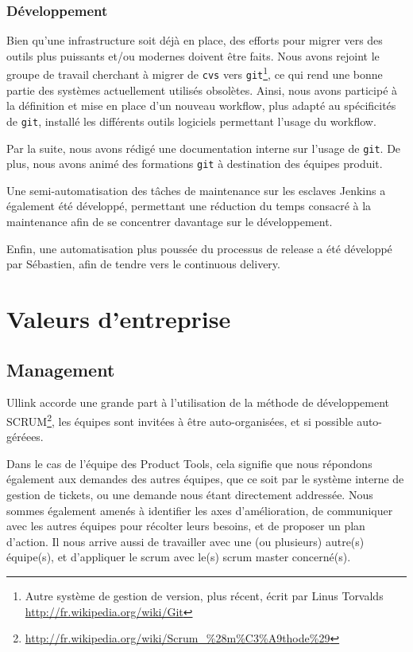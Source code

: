 \documentclass[a4paper, 12pt]{article}
\newcommand{\git}{\texttt{git}}
\begin{document}
\subsubsection{Développement}

Bien qu'une infrastructure soit déjà en place, des efforts pour migrer vers des outils plus puissants et/ou modernes doivent être faits. Nous avons rejoint le groupe de travail cherchant à migrer de \texttt{cvs} vers \git\footnote{Autre système de gestion de version, plus récent, écrit par Linus Torvalds \url{http://fr.wikipedia.org/wiki/Git}}, ce qui rend une bonne partie des systèmes actuellement utilisés obsolètes. Ainsi, nous avons participé à la définition et mise en place d'un nouveau workflow, plus adapté au spécificités de \git, installé les différents outils logiciels permettant l'usage du workflow.

Par la suite, nous avons rédigé une documentation interne sur l'usage de \git. De plus, nous avons animé des formations \texttt{git} à destination des équipes produit.

Une semi-automatisation des tâches de maintenance sur les esclaves Jenkins a également été développé, permettant une réduction du temps consacré à la maintenance afin de se concentrer davantage sur le développement.

Enfin, une automatisation plus poussée du processus de release a été développé par Sébastien, afin de tendre vers le continuous delivery.

\section{Valeurs d'entreprise}

\subsection{Management}

Ullink accorde une grande part à l'utilisation de la méthode de développement SCRUM\footnote{\url{http://fr.wikipedia.org/wiki/Scrum_\%28m\%C3\%A9thode\%29}}, les équipes sont invitées à être auto-organisées, et si possible auto-géréees.

Dans le cas de l'équipe des Product Tools, cela signifie que nous répondons également aux demandes des autres équipes, que ce soit par le système interne de gestion de tickets, ou une demande nous étant directement addressée. Nous sommes également amenés à identifier les axes d'amélioration, de communiquer avec les autres équipes pour récolter leurs besoins, et de proposer un plan d'action. Il nous arrive aussi de travailler avec une (ou plusieurs) autre(s) équipe(s), et d'appliquer le scrum avec le(s) scrum master concerné(s).
\end{document}
